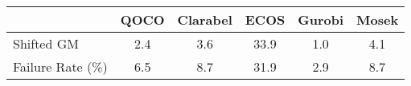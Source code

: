 \begin{tabular}{lccccc}
  \hline
   & \textbf{QOCO} & \textbf{Clarabel} & \textbf{ECOS} & \textbf{Gurobi} & \textbf{Mosek} \\ \hline
  Shifted GM & 2.4 & 3.6 & 33.9 & 1.0 & 4.1 \\ 
  Failure Rate (\%) & 6.5 & 8.7 & 31.9 & 2.9 & 8.7 \\ \hline 
\end{tabular}
